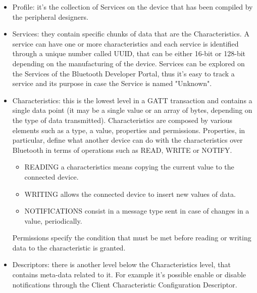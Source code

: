 \begin{itemize}
	\item Profile: it's the collection of Services on the device that has been compiled by the peripheral designers.
	
	\item Services: they contain specific chunks of data that are the Characteristics. A service can have one or more characteristics and each service is identified through a unique number called UUID, that can be either 16-bit or 128-bit depending on the manufacturing of the device.
	Services can be explored on the Services of the Bluetooth Developer Portal, thus it's easy to track a service and its purpose in case the Service is named "Unknown".
	
	\item Characteristics: this is the lowest level in a GATT transaction and contains a single data point (it may be a single value or an array of bytes, depending on the type of data transmitted). Characteristics are composed by various elements such as a type, a value, properties and permissions.
	Properties, in particular, define what another device can do with the characteristics over Bluetooth in terms of operations such as READ, WRITE or NOTIFY.
	\begin{itemize}
		\item READING a characteristics means copying the current value to the connected device.
		\item WRITING allows the connected device to insert new values of data.
		\item NOTIFICATIONS consist in a message type sent in case of changes in a value, periodically.
	\end{itemize}
	Permissions specify the condition that must be met before reading or writing data to the characteristic is granted.
	
	\item Descriptors: there is another level below the Characteristics level, that contains meta-data related to it. For example it's possible enable or disable notifications through the Client Characteristic Configuration Descriptor.
\end{itemize}
